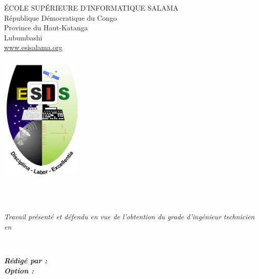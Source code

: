 \begin{titlepage} %
	\center %
	
	
	{\large ÉCOLE SUPÉRIEURE D’INFORMATIQUE SALAMA}\\ %
	
	{\large République Démocratique du Congo}\\ %
	
	{\large Province du Haut-Katanga}\\ %
	
	{\large Lubumbashi}\\ %
	
	{\large \href{www.esisalama.org}{www.esisalama.org}}\\[0.25cm] %

	\HHRule\\[1cm]

    \includegraphics[width=40mm]{images/logoesis.png}\\[0.5cm]

	
	\HRule\\[0.4cm]
	
	\textbf{\TTfc}
	
	\HRule\\[1.5cm]
	\hfill
	\begin{minipage}{0.6\linewidth}
		\textit{Travail présenté et défendu en vue de l’obtention
		du grade d’ingénieur technicien en \Filiere}\\
	\end{minipage}
	\\
	\hfill
	\begin{minipage}{0.6\textwidth}
		\textit{\textbf{Rédigé par : \ATfc}}
		\\
		\textit{\textbf{Option  : \Filiere}}
	\end{minipage}
	

\end{titlepage}
